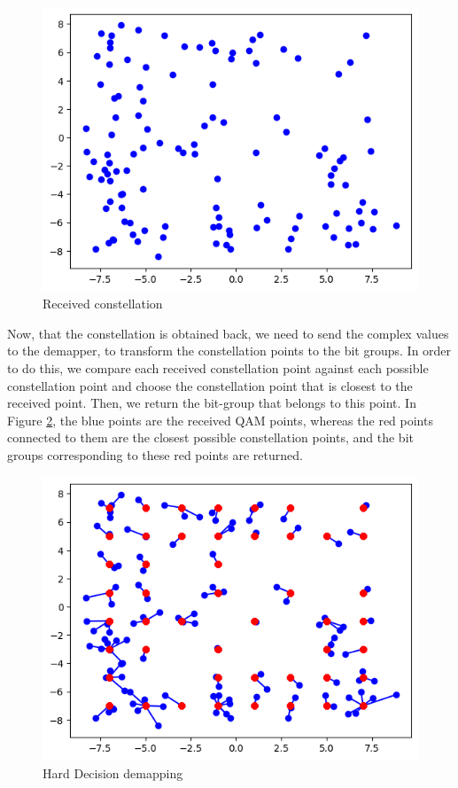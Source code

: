 \begin{figure}[htbp]
    \centering
    \includegraphics[width=\linewidth]{../Source/results/data_carriers}
    \caption{Received constellation}
    \label{received}
\end{figure}

Now, that the constellation is obtained back, we need to send the complex values to the demapper, to transform the constellation points to the bit groups. In order to do this, we compare each received constellation point against each possible constellation point and choose the constellation point that is closest to the received point. Then, we return the bit-group that belongs to this point. In Figure \ref{hard-decision}, the blue points are the received QAM points, whereas the red points connected to them are the closest possible constellation points, and the bit groups corresponding to these red points are returned.

\begin{figure}[htbp]
    \centering
    \includegraphics[width=\linewidth]{../Source/results/demapping}
    \caption{Hard Decision demapping}
    \label{hard-decision}
\end{figure}

